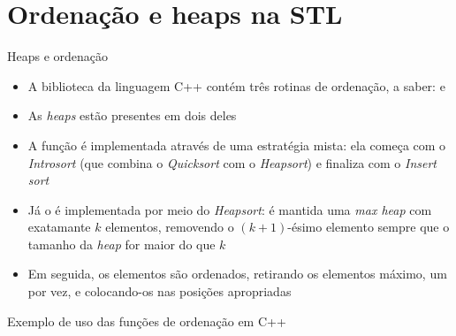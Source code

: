 \section{Ordenação e heaps na STL}

\begin{frame}[fragile]{Heaps e ordenação}

    \begin{itemize}
        \item A biblioteca  da linguagem C++ contém três rotinas de 
            ordenação, a saber:  e 

        \item As \textit{heaps} estão presentes em dois deles

        \item A função  é implementada através de uma estratégia mista: ela
            começa com o \textit{Introsort} (que combina o \textit{Quicksort} com o \textit{Heapsort}) e 
            finaliza com o \textit{Insert sort}

        \item Já o  é implementada por meio do \textit{Heapsort}: é mantida
            uma \textit{max heap} com exatamante $k$ elementos, removendo o $(k + 1)$-ésimo
            elemento sempre que o tamanho da \textit{heap} for maior do que $k$

        \item Em seguida, os elementos são ordenados, retirando os elementos máximo, um por vez,
            e colocando-os nas posições apropriadas
    \end{itemize}

\end{frame}

\begin{frame}[fragile]{Exemplo de uso das funções de ordenação em C++}
\end{frame}
